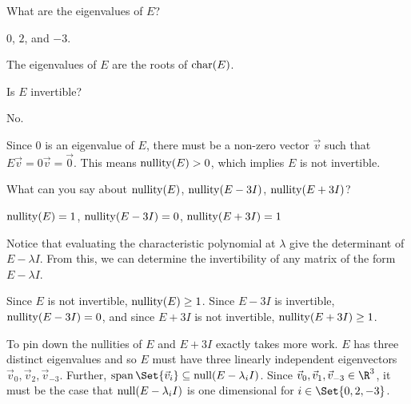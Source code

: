 	\begin{parts}
		\item What are the eigenvalues of $E$?
			\begin{solution}
				$0$, $2$, and $-3$. 

				The eigenvalues of $E$ are the roots of $\operatorname{char}(E)$. 
			\end{solution}
		\item Is $E$ invertible?
			\begin{solution}
				No. 

				Since $0$ is an eigenvalue of $E$, there must be a non-zero vector
				$\vec v$ such that $E\vec v=0\vec v=\vec 0$. This means $\operatorname{nullity}(E)>0$,
				which implies $E$ is not invertible. 
			\end{solution}
		\item What can you say about $\operatorname{nullity}(E)$, $\operatorname{nullity}(E-3I)$, $\operatorname{nullity}(E+3I)$?
			\begin{solution}
				$\operatorname{nullity}(E)=1$, $\operatorname{nullity}(E-3I)=0$, $\operatorname{nullity}(E+3I)=1$

				Notice that evaluating the characteristic polynomial at $\lambda$
				give the determinant of $E-\lambda I$. From this, we can determine the
				invertibility of any matrix of the form $E-\lambda I$.

				Since $E$ is not invertible, $\operatorname{nullity}(E)\geq 1$. Since $E-3I$ is
				invertible, $\operatorname{nullity}(E-3I)=0$, and since $E+3I$ is not invertible,
				$\operatorname{nullity}(E+3I)\geq 1$.

				To pin down the nullities of $E$ and $E+3I$ exactly takes more work.
				$E$ has three distinct eigenvalues and so $E$ must have three linearly
				independent eigenvectors $\vec v_0,\vec v_2,\vec v_{-3}$. Further, $\Span\Set{\vec v_i}\subseteq 
				\Null(E-\lambda_i I)$.				
				Since $\vec v_0,\vec v_1,\vec v_{-3}\in\R^3$, it must be the case that $\operatorname{null}(E-\lambda_i I)$ is one
				dimensional for $i\in\Set{0,2,-3}$.
			\end{solution}
	\end{parts}






